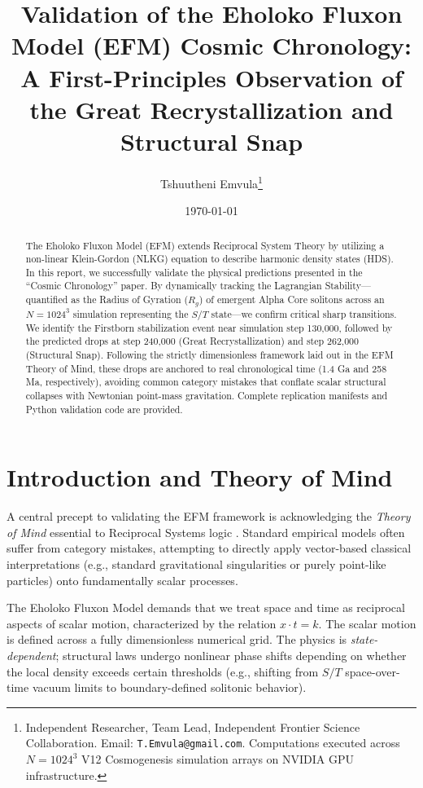 \documentclass[11pt, twoside]{article}
\title{\textbf{Validation of the Eholoko Fluxon Model (EFM) Cosmic Chronology: \\ \Large A First-Principles Observation of the Great Recrystallization and Structural Snap}}
\author{Tshuutheni Emvula\thanks{Independent Researcher, Team Lead, Independent Frontier Science Collaboration. Email: \texttt{T.Emvula@gmail.com}. Computations executed across $N=1024^3$ V12 Cosmogenesis simulation arrays on NVIDIA GPU infrastructure.}}
\date{\today}
\begin{document}
\maketitle
\thispagestyle{empty}

\begin{abstract}
The Eholoko Fluxon Model (EFM) extends Reciprocal System Theory by utilizing a non-linear Klein-Gordon (NLKG) equation to describe harmonic density states (HDS). In this report, we successfully validate the physical predictions presented in the ``Cosmic Chronology'' paper. By dynamically tracking the Lagrangian Stability---quantified as the Radius of Gyration ($R_g$) of emergent Alpha Core solitons across an $N=1024^3$ simulation representing the $S/T$ state---we confirm critical sharp transitions. We identify the Firstborn stabilization event near simulation step 130,000, followed by the predicted drops at step 240,000 (Great Recrystallization) and step 262,000 (Structural Snap). Following the strictly dimensionless framework laid out in the EFM Theory of Mind, these drops are anchored to real chronological time (1.4 Ga and 258 Ma, respectively), avoiding common category mistakes that conflate scalar structural collapses with Newtonian point-mass gravitation. Complete replication manifests and Python validation code are provided.
\end{abstract}

\clearpage
\tableofcontents
\clearpage

\section{Introduction and Theory of Mind}
A central precept to validating the EFM framework is acknowledging the \textit{Theory of Mind} essential to Reciprocal Systems logic \cite{emvula2025_foundational, emvula2025_engine}. Standard empirical models often suffer from category mistakes, attempting to directly apply vector-based classical interpretations (e.g., standard gravitational singularities or purely point-like particles) onto fundamentally scalar processes.

The Eholoko Fluxon Model demands that we treat space and time as reciprocal aspects of scalar motion, characterized by the relation $x \cdot t = k$. The scalar motion is defined across a fully dimensionless numerical grid. The physics is \textit{state-dependent}; structural laws undergo nonlinear phase shifts depending on whether the local density exceeds certain thresholds (e.g., shifting from $S/T$ space-over-time vacuum limits to boundary-defined solitonic behavior). 
\end{document}
